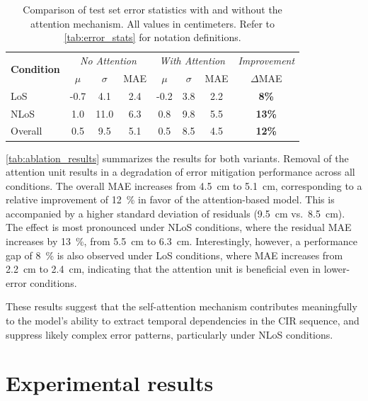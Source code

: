 \begin{table}[tbh]
\centering
\caption[Error statistics with and without the attention mechanism.]{Comparison of test set error statistics with and without the attention mechanism. All values in centimeters. Refer to \autoref{tab:error_stats} for notation definitions.}
\label{tab:ablation_results}
\begin{tabular}{lccc|ccc|c}
\toprule
\multirow{2}{*}{\textbf{Condition}} &
\multicolumn{3}{c|}{\textit{No Attention}} &
\multicolumn{3}{c|}{\textit{With Attention}} &
\textit{Improvement} \\
& $\mu$ & $\sigma$ & MAE & $\mu$ & $\sigma$ & MAE & $\Delta$MAE \\
\midrule
LoS     & -0.7 & 4.1  & 2.4 & -0.2 & 3.8 & 2.2 & \textbf{8\%} \\
NLoS    & 1.0  & 11.0 & 6.3 & 0.8  & 9.8 & 5.5 & \textbf{13\%} \\
Overall & 0.5  & 9.5  & 5.1 & 0.5  & 8.5 & 4.5 & \textbf{12\%} \\
\bottomrule
\end{tabular}
\end{table}

\autoref{tab:ablation_results} summarizes the results for both variants. Removal of the attention unit results in a degradation of error mitigation performance across all conditions. The overall MAE increases from \SI{4.5}{\centi\metre} to \SI{5.1}{\centi\metre}, corresponding to a relative improvement of \SI{12}{\percent} in favor of the attention-based model. This is accompanied by a higher standard deviation of residuals (\SI{9.5}{\centi\metre} vs.\ \SI{8.5}{\centi\metre}). The effect is most pronounced under NLoS conditions, where the residual MAE increases by \SI{13}{\percent}, from \SI{5.5}{\centi\metre} to \SI{6.3}{\centi\metre}. Interestingly, however, a performance gap of \SI{8}{\percent} is also observed under LoS conditions, where MAE increases from \SI{2.2}{\centi\metre} to \SI{2.4}{\centi\metre}, indicating that the attention unit is beneficial even in lower-error conditions.

These results suggest that the self-attention mechanism contributes meaningfully to the model's ability to extract temporal dependencies in the CIR sequence, and suppress likely complex error patterns, particularly under NLoS conditions.


\section{Experimental results}

